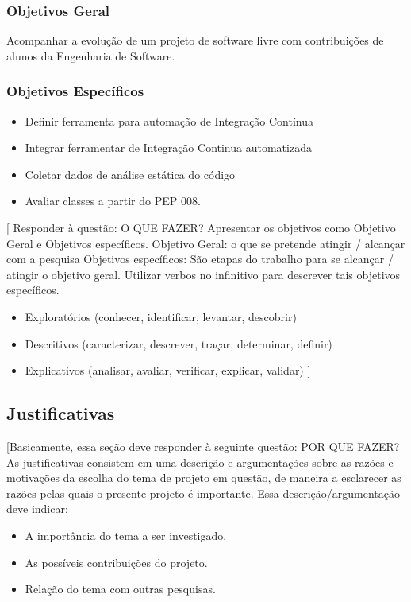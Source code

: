 \subsubsection{Objetivos Geral}

Acompanhar a evolução de um projeto de software livre com contribuições de alunos
da Engenharia de Software.

\subsubsection{Objetivos Específicos}
\begin{itemize}
	\item Definir ferramenta para automação de Integração Contínua
	\item Integrar ferramentar de Integração Continua automatizada
	\item Coletar dados de análise estática do código
	\item Avaliar classes a partir do PEP 008.
\end{itemize}
[ Responder à questão: O QUE FAZER?
Apresentar os objetivos como Objetivo Geral e Objetivos específicos.
Objetivo Geral: o que se pretende atingir / alcançar com a pesquisa
Objetivos específicos: São etapas do trabalho para se alcançar / atingir o objetivo geral. Utilizar verbos no infinitivo para descrever tais objetivos específicos.
\begin{itemize}
	\item Exploratórios (conhecer, identificar, levantar, descobrir)
	\item Descritivos (caracterizar, descrever, traçar, determinar, definir)
	\item Explicativos (analisar, avaliar, verificar, explicar, validar)   ]
\end{itemize}


\subsection{Justificativas} %
\label{sub:justificativas}

[Basicamente, essa seção deve responder à seguinte questão: POR QUE FAZER?
As justificativas consistem em uma descrição e argumentações sobre as razões e motivações da escolha do tema de projeto em questão, de maneira a esclarecer as razões pelas quais o presente projeto é importante.
Essa descrição/argumentação deve indicar:
\begin{itemize}
	\item A importância do tema a ser investigado.
	\item As possíveis contribuições do projeto.
	\item Relação do tema com outras pesquisas.
\end{itemize}

